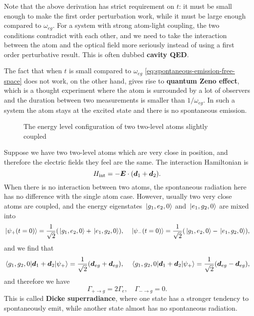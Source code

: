 \documentclass[hyperref, a4paper]{article}
\newcommand*{\concept}[1]{{\textbf{#1}}}
\begin{document}
Note that the above derivation has strict requirement on $t$: it must be small enough to make the first order perturbation work,
while it must be large enough compared to $\omega_{eg}$.
For a system with strong atom-light coupling, the two conditions contradict with each other, and we need to take the interaction 
between the atom and the optical field more seriously instead of using a first order perturbative result.
This is often dubbed \concept{cavity QED}.

The fact that when $t$ is small compared to $\omega_{eg}$ \eqref{eq:spontaneous-emission-free-space} does not work, on the other hand,  
gives rise to \concept{quantum Zeno effect}, which is a thought experiment where the atom is surrounded by a lot of observers
and the duration between two measurements is smaller than $1 / \omega_{eg}$. In such a system the atom stays at the excited state
and there is no spontaneous emission.

\begin{figure}
    \centering
    
    \caption{The energy level configuration of two two-level atoms slightly coupled}
    \label{fig:energy-level-config}
\end{figure}

Suppose we have two two-level atoms which are  very close in position, and therefore the electric fields they 
feel are the same. The interaction Hamiltonian is 
\begin{equation}
    H_\text{int} = - \vb*{E} \cdot (\vb*{d}_1 + \vb*{d}_2).
\end{equation}
When there is no interaction between two atoms, the spontaneous radiation here has no difference with 
the single atom case. However, usually two very close atoms are coupled, and the energy eigenstates 
$\ket*{g_1, e_2, 0}$ and $\ket*{e_1, g_2, 0}$ are mixed into
\begin{equation}
    \ket*{\psi_+(t=0)} = \frac{1}{\sqrt{2}} (\ket*{g_1, e_2, 0} + \ket*{e_1, g_2, 0}), \quad 
    \ket*{\psi_-(t=0)} = \frac{1}{\sqrt{2}} (\ket*{g_1, e_2, 0} - \ket*{e_1, g_2, 0}),
\end{equation}
and we find that 
\[
    \mel{g_1, g_2, 0}{\vb*{d}_1 + \vb*{d}_2}{\psi_+} = \frac{1}{\sqrt{2}} (\vb*{d}_{eg} + \vb*{d}_{eg}), \quad
    \mel{g_1, g_2, 0}{\vb*{d}_1 + \vb*{d}_2}{ \psi_+} = \frac{1}{\sqrt{2}} (\vb*{d}_{eg} - \vb*{d}_{eg}),
\]
and therefore we have
\begin{equation}
    \Gamma_{+ \to g} = 2 \Gamma_e, \quad \Gamma_{- \to g} = 0.
\end{equation}
This is called \concept{Dicke superradiance}, where one state has a stronger tendency to spontaneously emit,
while another state almost has no spontaneous radiation.
\end{document}

